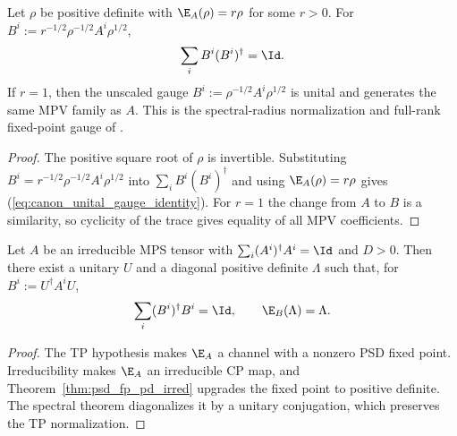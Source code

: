 \begin{theorem}%
    \label{thm:unital_gauge_of_pd_fixed_point}
    \leanok
    Let $\rho$ be positive definite with $\E_A(\rho)=r\rho$ for some $r>0$. For
    $B^i := r^{-1/2}\rho^{-1/2}A^i\rho^{1/2}$,
    \begin{equation}\label{eq:canon_unital_gauge_identity}
        \sum_i B^i(B^i)^\dagger = \Id.
    \end{equation}
    If $r=1$, then the unscaled gauge $B^i := \rho^{-1/2}A^i\rho^{1/2}$ is unital
    and generates the same MPV family as $A$. This is the spectral-radius
    normalization and full-rank fixed-point gauge of
    \cite[Theorem~4]{PerezGarcia2007Matrix}.
\end{theorem}

\begin{proof}\leanok
    The positive square root of $\rho$ is invertible. Substituting
    $B^i=r^{-1/2}\rho^{-1/2}A^i\rho^{1/2}$ into $\sum_i B^i(B^i)^\dagger$ and
    using $\E_A(\rho)=r\rho$ gives
    (\ref{eq:canon_unital_gauge_identity}). For $r=1$ the change from $A$ to $B$
    is a similarity, so cyclicity of the trace gives equality of all MPV
    coefficients.
\end{proof}

\begin{theorem}\label{thm:form_II}
    \leanok
    Let $A$ be an irreducible MPS tensor with $\sum_i (A^i)^\dagger A^i = \Id$ and
    $D > 0$. Then there exist a unitary $U$ and a diagonal positive definite
    $\Lambda$ such that, for $B^i := U^\dagger A^i U$,
    \[
        \sum_i (B^i)^\dagger B^i = \Id,
        \qquad
        \E_B(\Lambda) = \Lambda.
    \]
\end{theorem}

\begin{proof}
    \leanok
    The TP hypothesis makes $\E_A$ a channel with a nonzero PSD fixed point.
    Irreducibility makes $\E_A$ an irreducible CP map, and
    Theorem~\ref{thm:psd_fp_pd_irred} upgrades the fixed point to positive
    definite. The spectral theorem diagonalizes it by a unitary conjugation,
    which preserves the TP normalization.
\end{proof}

